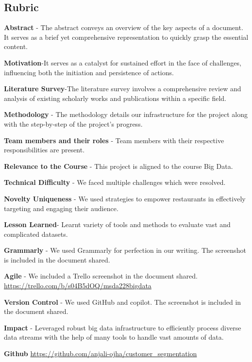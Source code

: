 \documentclass[conference]{IEEEtran}
\begin{document}
\appendix

\subsection{Rubric}
\textbf{Abstract} - The abstract conveys an overview of the key aspects of a document. It serves as a brief yet comprehensive representation to quickly grasp the essential content.

\textbf{Motivation}-It serves as a catalyst for sustained effort in the face of challenges, influencing both the initiation and persistence of actions.

\textbf{Literature Survey}-The literature survey involves a comprehensive review and analysis of existing scholarly works and publications within a specific field.

\textbf{Methodology} - The methodology details our infrastructure for the project along with the step-by-step of the project's progress.

\textbf{Team members and their roles} - Team members with their respective responsibilities are present.

\textbf{Relevance to the Course} - This project is aligned to the course Big Data.

\textbf{Technical Difficulty} - We faced multiple challenges which were resolved.

\textbf{Novelty Uniqueness} - We used strategies to empower restaurants in effectively targeting and engaging their audience.

\textbf{Lesson Learned}- Learnt variety of tools and methods to evaluate vast and complicated datasets.

\textbf{Grammarly} - We used Grammarly for perfection in our writing. The screenshot is included in the document shared.

\textbf{Agile} - We included a Trello screenshot in the document shared. \url{https://trello.com/b/s04B5dOQ/msda228bigdata}

\textbf{Version Control} - We used GitHub and copilot. The screenshot is included in the document shared.

\textbf{Impact} - Leveraged robust big data infrastructure to efficiently process diverse data streams with the help of many tools to handle vast amounts of data.


\textbf{Github} \url{https://github.com/anjali-ojha/customer_segmentation}
\end{document}
